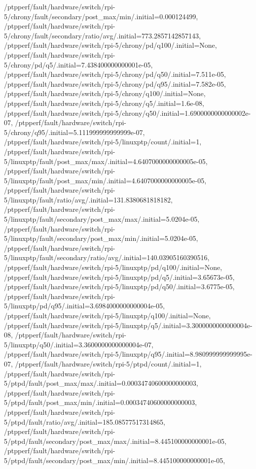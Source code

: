{    /ptpperf/fault/hardware/switch/rpi-5/chrony/fault/secondary/post_max/min/.initial=0.000124499,
    /ptpperf/fault/hardware/switch/rpi-5/chrony/fault/secondary/ratio/avg/.initial=773.2857142857143,
    /ptpperf/fault/hardware/switch/rpi-5/chrony/pd/q100/.initial=None,
    /ptpperf/fault/hardware/switch/rpi-5/chrony/pd/q5/.initial=7.438400000000001e-05,
    /ptpperf/fault/hardware/switch/rpi-5/chrony/pd/q50/.initial=7.511e-05,
    /ptpperf/fault/hardware/switch/rpi-5/chrony/pd/q95/.initial=7.582e-05,
    /ptpperf/fault/hardware/switch/rpi-5/chrony/q100/.initial=None,
    /ptpperf/fault/hardware/switch/rpi-5/chrony/q5/.initial=1.6e-08,
    /ptpperf/fault/hardware/switch/rpi-5/chrony/q50/.initial=1.6900000000000002e-07,
    /ptpperf/fault/hardware/switch/rpi-5/chrony/q95/.initial=5.111999999999999e-07,
    /ptpperf/fault/hardware/switch/rpi-5/linuxptp/count/.initial=1,
    /ptpperf/fault/hardware/switch/rpi-5/linuxptp/fault/post_max/max/.initial=4.6407000000000005e-05,
    /ptpperf/fault/hardware/switch/rpi-5/linuxptp/fault/post_max/min/.initial=4.6407000000000005e-05,
    /ptpperf/fault/hardware/switch/rpi-5/linuxptp/fault/ratio/avg/.initial=131.8380681818182,
    /ptpperf/fault/hardware/switch/rpi-5/linuxptp/fault/secondary/post_max/max/.initial=5.0204e-05,
    /ptpperf/fault/hardware/switch/rpi-5/linuxptp/fault/secondary/post_max/min/.initial=5.0204e-05,
    /ptpperf/fault/hardware/switch/rpi-5/linuxptp/fault/secondary/ratio/avg/.initial=140.03905160390516,
    /ptpperf/fault/hardware/switch/rpi-5/linuxptp/pd/q100/.initial=None,
    /ptpperf/fault/hardware/switch/rpi-5/linuxptp/pd/q5/.initial=3.65673e-05,
    /ptpperf/fault/hardware/switch/rpi-5/linuxptp/pd/q50/.initial=3.6775e-05,
    /ptpperf/fault/hardware/switch/rpi-5/linuxptp/pd/q95/.initial=3.6984000000000004e-05,
    /ptpperf/fault/hardware/switch/rpi-5/linuxptp/q100/.initial=None,
    /ptpperf/fault/hardware/switch/rpi-5/linuxptp/q5/.initial=3.3000000000000004e-08,
    /ptpperf/fault/hardware/switch/rpi-5/linuxptp/q50/.initial=3.3600000000000004e-07,
    /ptpperf/fault/hardware/switch/rpi-5/linuxptp/q95/.initial=8.980999999999995e-07,
    /ptpperf/fault/hardware/switch/rpi-5/ptpd/count/.initial=1,
    /ptpperf/fault/hardware/switch/rpi-5/ptpd/fault/post_max/max/.initial=0.00034740600000000003,
    /ptpperf/fault/hardware/switch/rpi-5/ptpd/fault/post_max/min/.initial=0.00034740600000000003,
    /ptpperf/fault/hardware/switch/rpi-5/ptpd/fault/ratio/avg/.initial=185.08577517314865,
    /ptpperf/fault/hardware/switch/rpi-5/ptpd/fault/secondary/post_max/max/.initial=8.445100000000001e-05,
    /ptpperf/fault/hardware/switch/rpi-5/ptpd/fault/secondary/post_max/min/.initial=8.445100000000001e-05,
}

